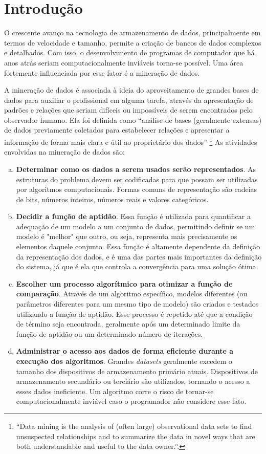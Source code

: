 \chapter{Introdução}

O crescente avanço na tecnologia de armazenamento de dados, principalmente em termos de velocidade e tamanho, permite a criação de bancos de dados complexos e detalhados. Com isso, o desenvolvimento de programas de computador que há anos atrás seriam computacionalmente inviáveis torna-se possível. Uma área fortemente influenciada por esse fator é a mineração de dados.

A mineração de dados é associada à ideia do aproveitamento de grandes bases de dados para auxiliar o profissional em alguma tarefa, através da apresentação de padrões e relações que seriam difíceis ou impossíveis de serem encontrados pelo observador humano. Ela foi definida como ``análise de bases (geralmente extensas) de dados previamente coletados para estabelecer relações e apresentar a informação de forma mais clara e útil ao proprietário dos dados'' \cite[p. 1]{Hand2001}\footnote{``Data mining is the analysis of (often large) observational data sets to find unsuspected relationships and to summarize the data in novel ways that are both understandable and useful to the data owner.''.} As atividades envolvidas na mineração de dados são:

\begin{enumerate}[a)]
    \item \textbf{Determinar como os dados a serem usados serão representados}. As estruturas do problema devem ser codificadas para que possam ser utilizadas por algoritmos computacionais. Formas comuns de representação são cadeias de bits, números inteiros, números reais e valores categóricos.
    \item \textbf{Decidir a função de aptidão}. Essa função é utilizada para quantificar a adequação de um modelo a um conjunto de dados, permitindo definir se um modelo é "melhor" que outro, ou seja, representa mais precisamente os elementos daquele conjunto. Essa função é altamente dependente da definição da representação dos dados, e é uma das partes mais importantes da definição do sistema, já que é ela que controla a convergência para uma solução ótima.
    \item \textbf{Escolher um processo algorítmico para otimizar a função de comparação}. Através de um algoritmo específico, modelos diferentes (ou parâmetros diferentes para um mesmo tipo de modelo) são criados e testados utilizando a função de aptidão. Esse processo é repetido até que a condição de término seja encontrada, geralmente após um determinado limite da função de aptidão ou um determinado número de iterações.
    \item \textbf{Administrar o acesso aos dados de forma eficiente durante a execução dos algoritmos}. Grandes \emph{datasets} geralmente excedem o tamanho dos dispositivos de armazenamento primário atuais. Dispositivos de armazenamento secundário ou terciário são utilizados, tornando o acesso a esses dados ineficiente. Um algoritmo corre o risco de tornar-se computacionalmente inviável caso o programador não considere esse fato.
\end{enumerate}

